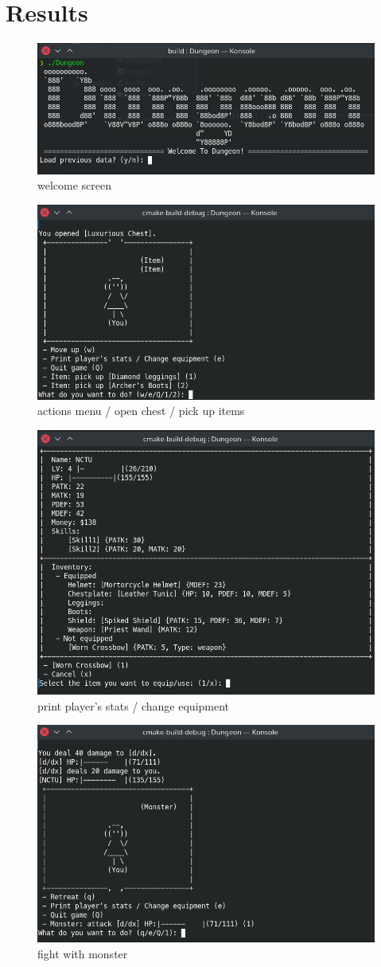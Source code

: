 \documentclass{article}
\begin{document}
\section{Results}\label{subsection:results}
\begin{figure}[H]
    \centering
    \includegraphics[width=0.7\linewidth]{welcome}
    \caption{welcome screen}
\end{figure}
\begin{figure}[H]
    \centering
    \includegraphics[width=0.7\linewidth]{actions_menu}
    \caption{actions menu / open chest / pick up items}
\end{figure}
\begin{figure}[H]
    \centering
    \includegraphics[width=0.7\linewidth]{print_stats}
    \caption{print player's stats / change equipment}
\end{figure}
\begin{figure}[H]
    \centering
    \includegraphics[width=0.7\linewidth]{fight}
    \caption{fight with monster}
\end{figure}
\end{document}
